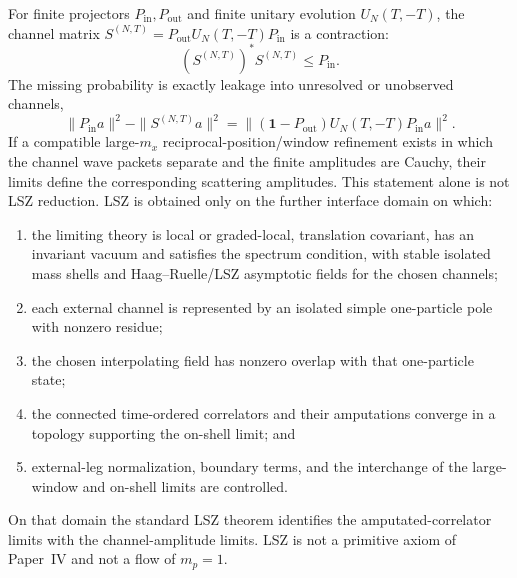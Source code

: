 \documentclass[12pt,a4paper]{article}
\begin{document}
\begin{theorem}
\label{p4:thm:finite-channel-scattering-lsz-interface}
\leavevmode\par\noindent
For finite projectors \(P_{\mathrm{in}},P_{\mathrm{out}}\) and finite unitary
evolution \(U_N(T,-T)\), the channel matrix
\(S^{(N,T)}=P_{\mathrm{out}}U_N(T,-T)P_{\mathrm{in}}\) is a contraction:
\begin{equation}
\label{p4:eq:finite-scattering-contraction}
(S^{(N,T)})^*S^{(N,T)}\le P_{\mathrm{in}}.
\end{equation}
The missing probability is exactly leakage into unresolved or unobserved
channels,
\begin{equation}
\label{p4:eq:finite-channel-leakage}
\|P_{\mathrm{in}}a\|^2-\|S^{(N,T)}a\|^2
=
\|(\mathbf 1-P_{\mathrm{out}})U_N(T,-T)P_{\mathrm{in}}a\|^2.
\end{equation}
If a compatible large-\(m_x\) reciprocal-position/window refinement exists
in which the channel wave packets separate and the finite amplitudes are
Cauchy, their limits define the corresponding scattering amplitudes.
This statement alone is not LSZ reduction.  LSZ is obtained only on the
further interface domain on which:
\begin{enumerate}[label=(\alph*), leftmargin=2em]
\item the limiting theory is local or graded-local, translation covariant,
      has an invariant vacuum and satisfies the spectrum condition, with
      stable isolated mass shells and Haag--Ruelle/LSZ asymptotic fields for
      the chosen channels;
\item each external channel is represented by an isolated simple
      one-particle pole with nonzero residue;
\item the chosen interpolating field has nonzero overlap with that
      one-particle state;
\item the connected time-ordered correlators and their amputations converge
      in a topology supporting the on-shell limit; and
\item external-leg normalization, boundary terms, and the interchange of
      the large-window and on-shell limits are controlled.
\end{enumerate}
On that domain the standard LSZ theorem identifies the amputated-correlator
limits with the channel-amplitude limits.  LSZ is not a primitive axiom of
Paper~IV and not a flow of \(m_p=1\).
\end{theorem}
\end{document}

